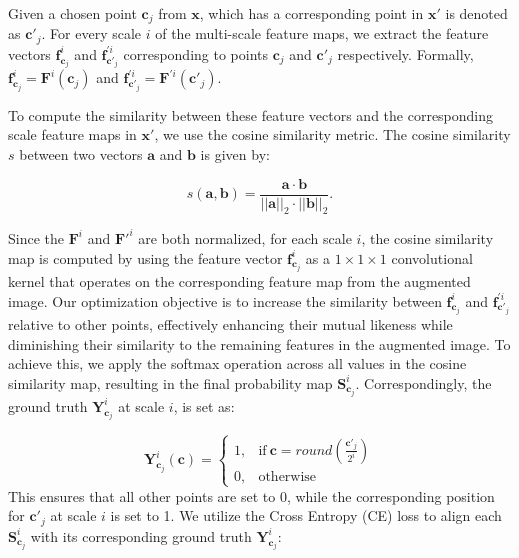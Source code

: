 \documentclass[times,twocolumn,final]{elsarticle}
\begin{document}
\par Given a chosen point $\bm{c}_j$ from $\bm{x}$, which has a corresponding point in $\bm{x}'$ is denoted as $\bm{c}'_j$. For every scale $i$ of the multi-scale feature maps, we extract the feature vectors $\bm{f}_{\bm{c}_j}^i$ and $\bm{f}_{\bm{c}'_j}^{'i}$ corresponding to points $\bm{c}_j$ and $\bm{c}'_j$ respectively. Formally, $\bm{f}_{\bm{c}_j}^i=\bm{F}^i(\bm{c}_j)$ and $\bm{f}_{\bm{c}'_j}^{'i}=\bm{F}^{'i}(\bm{c}'_j)$.

\par To compute the similarity between these feature vectors and the corresponding scale feature maps in $\bm{x'}$, we use the cosine similarity metric. The cosine similarity $s$ between two vectors $\bm{a}$ and $\bm{b}$ is given by:

\begin{equation}
s(\bm{a}, \bm{b}) = \frac{\bm{a} \cdot \bm{b}}{||\bm{a}||_2 \cdot ||\bm{b}||_2} .
\end{equation}

\par Since the $\bm{F}^i$ and $\bm{F}'^i$ are both normalized, for each scale $i$, the cosine similarity map is computed by using the feature vector $\bm{f}_{\bm{c}_j}^i$ as a $1\times1\times1$ convolutional kernel that operates on the corresponding feature map from the augmented image. Our optimization objective is to increase the similarity between $\bm{f}_{\bm{c}_j}^i$ and $\bm{f}_{\bm{c}'_j}^{'i}$ relative to other points, effectively enhancing their mutual likeness while diminishing their similarity to the remaining features in the augmented image. To achieve this, we apply the softmax operation across all values in the cosine similarity map, resulting in the final probability map $\bm{S}^i_{\bm{c}_j}$. Correspondingly, the ground truth $\bm{Y}^i_{\bm{c}_j}$ at scale $i$, is set as: 

\begin{equation}
\bm{Y}^i_{\bm{c}_j}(\bm{c}) = 
\begin{cases} 
1, & \text{if}\ \bm{c} = round(\frac{\bm{c}'_j}{2^i}) \\
0, & \text{otherwise}
\end{cases}
\end{equation}
This ensures that all other points are set to 0, while the corresponding position for $\bm{c}'_j$ at scale $i$ is set to 1. We utilize the Cross Entropy (CE) loss to align each $\bm{S}^i_{\bm{c}_j}$ with its corresponding ground truth $\bm{Y}^i_{\bm{c}_j}$:
\end{document}
